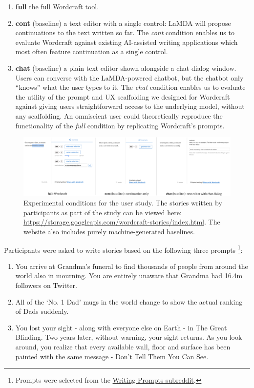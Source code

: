\begin{enumerate}
    \item \textbf{full} the full Wordcraft tool.
    \item \textbf{cont} (baseline) a text editor with a single control: LaMDA will propose continuations to the text written so far. The \textit{cont} condition enables us to evaluate Wordcraft against existing AI-assisted writing applications which most often feature continuation as a single control.
    \item \textbf{chat} (baseline) a plain text editor shown alongside a chat dialog window.
    Users can converse with the LaMDA-powered chatbot, but the chatbot only ``knows'' what the user types to it.
    The \textit{chat} condition enables us to evaluate the utility of the prompt and UX scaffolding we designed for Wordcraft against giving users straightforward access to the underlying model, without any scaffolding. An omniscient user could theoretically reproduce the functionality of the \textit{full} condition by replicating Wordcraft's prompts.
\end{enumerate}

\begin{figure}[tbp]
  \centering
  \includegraphics[width=1\linewidth]{figures/conditions.png}
  \caption{Experimental conditions for the user study. The stories written by participants as part of the study can be viewed here: \href{https://storage.googleapis.com/wordcraft-stories/index.html}{https://storage.googleapis.com/wordcraft-stories/index.html}. The website also includes purely machine-generated baselines.}
  \label{fig:conditions}
\end{figure}

\noindent Participants were asked to write stories based on the following three prompts \footnote{Prompts were selected from the \href{https://www.reddit.com/r/WritingPrompts/}{Writing Prompts subreddit}.}:
\begin{enumerate}
    \item You arrive at Grandma's funeral to find thousands of people from around the world also in mourning. You are entirely unaware that Grandma had 16.4m followers on Twitter.
    \item All of the `No. 1 Dad' mugs in the world change to show the actual ranking of Dads suddenly.
    \item You lost your sight - along with everyone else on Earth - in The Great Blinding. Two years later, without warning, your sight returns. As you look around, you realize that every available wall, floor and surface has been painted with the same message - Don't Tell Them You Can See.
\end{enumerate}

